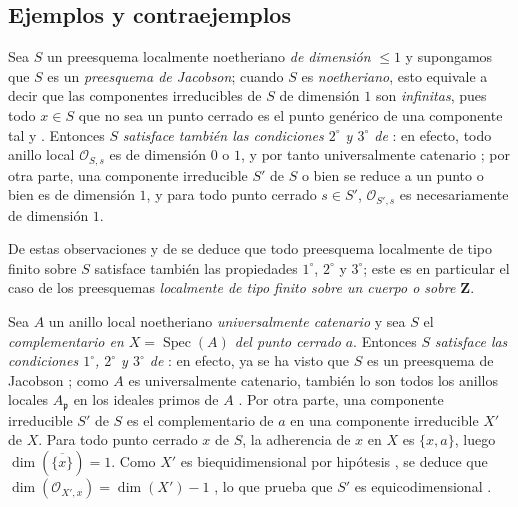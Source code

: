 \subsection{Ejemplos y contraejemplos}
\label{subsection:IV.10.7}

\begin{env}[10.7.1]
\label{IV.10.7.1}
Sea $S$ un preesquema localmente noetheriano \emph{de dimensión} $\leq1$ y supongamos que $S$ es un \emph{preesquema de Jacobson}; cuando $S$ es \emph{noetheriano}, esto equivale a decir que las componentes irreducibles de $S$ de dimensión $1$ son \emph{infinitas}, pues todo $x\in S$ que no sea un punto cerrado es el punto genérico de una componente tal  y .
Entonces $S$ \emph{satisface también las condiciones $2^\circ$ y $3^\circ$ de} : en efecto, todo anillo local $\mathcal O_{S,s}$ es de dimensión $0$ o $1$, y por tanto universalmente catenario ; por otra parte, una componente irreducible $S'$ de $S$ o bien se reduce
a un punto o bien es de dimensión $1$, y para todo punto cerrado $s\in S'$, $\mathcal O_{S',s}$ es necesariamente de dimensión $1$.

De estas observaciones y de  se deduce que todo preesquema localmente de tipo finito sobre $S$ satisface también las propiedades $1^\circ$, $2^\circ$ y $3^\circ$; este es en particular el caso de los preesquemas \emph{localmente de tipo finito sobre un cuerpo o sobre $\mathbf Z$}.
\end{env}

\begin{env}[10.7.2]
\label{IV.10.7.2}
Sea $A$ un anillo local noetheriano \emph{universalmente catenario} y sea $S$ el \emph{complementario en $X=\operatorname{Spec}(A)$ del punto cerrado} $a$.
Entonces $S$ \emph{satisface las condiciones $1^\circ$, $2^\circ$ y $3^\circ$ de} : en efecto, ya se ha visto que $S$ es un preesquema de Jacobson ; como $A$ es universalmente catenario, también lo son todos los anillos locales $A_{\mathfrak p}$ en los ideales primos de $A$ .
Por otra parte, una componente irreducible $S'$ de $S$ es el complementario de $a$ en una componente irreducible $X'$ de $X$. Para todo punto cerrado $x$ de $S$, la adherencia de $x$ en $X$ es $\{x,a\}$, luego $\dim(\overline{\{x\}})=1$. Como $X'$ es biequidimensional por hipótesis , se deduce que $\dim(\mathcal O_{X',x})=\dim(X')-1$ , lo que prueba que $S'$ es equicodimensional .
\end{env}

